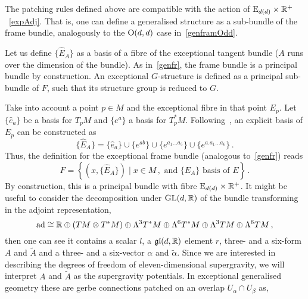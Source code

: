 \documentclass[debug]{phd}
\begin{document}
						The patching rules defined above are compatible with the action of $\mathrm{E}_{d(d)} \times \mathbb{R}^+$~\eqref{expAdj}.
						That is, one can define a generalised structure as a sub-bundle of the frame bundle, analogously to the $\mathrm{O}(d,d)$ case in~\cref{genframOdd}.
						
						Let us define $\{\hat{E}_A\}$ as a basis of a fibre of the exceptional tangent bundle ($A$ runs over the dimension of the bundle).
						As in~\eqref{genfr}, the frame bundle is a principal bundle by construction.
						An exceptional $G$-structure is defined as a principal sub-bundle of $F$, such that its structure group is reduced to $G$.
						
						Take into account a point $p \in M$ and the exceptional fibre in that point $E_p$.
						Let $\{\hat{e}_a\}$ be a basis for $T_p M$ and $\{e^a\}$ a basis for $T^*_p M$.
						Following~\cite{waldram4}, an explicit basis of $E_p$ can be constructed as
								\begin{equation}
									\{\hat{E}_A\} = \{\hat{e}_a\} \cup \{e^{ab}\} \cup \{e^{a_1 \ldots a_5}\} \cup \{e^{a. a_1 \ldots a_6}\} \, .
								\end{equation}
						Thus, the definition for the exceptional frame bundle (analogous to~\eqref{genfr}) reads
								\begin{equation}
									F = \left\{ \left(x, \{\hat{E}_A\} \right) \mid x \in M \, , \, \, \mbox{and}\, \, \{\hat{E}_A\}\, \, \mbox{basis of}\, \, E\right\} \, .
								\end{equation}
						By construction, this is a principal bundle with fibre $\mathrm{E}_{d(d)} \times \mathbb{R}^+$.
						It might be useful to consider the decomposition under $\mathrm{GL}(d,\mathbb{R})$ of the bundle transforming in the adjoint representation,
								\begin{equation}\label{eq:Ggeom-M}
									\operatorname{ad} \cong \mathbb{R} \oplus (TM\otimes T^*M) \oplus \Lambda^3 T^*M \oplus \Lambda^6 T^*M \oplus \Lambda^3 TM \oplus \Lambda^6 TM \, ,
								\end{equation}
						then one can see it contains a scalar $l$, a $\mathfrak{gl}(d,\mathbb{R})$ element $r$, three- and a six-form $A$ and $\tilde{A}$ and a three- and a six-vector $\alpha$ and $\tilde{\alpha}$.
						Since we are interested in describing the degrees of freedom of eleven-dimensional supergravity, we will interpret $A$ and $\tilde{A}$ as the supergravity potentials.
						In exceptional generalised geometry these are gerbe connections patched on an overlap $U_\alpha \cap U_\beta$ as,
\end{document}
